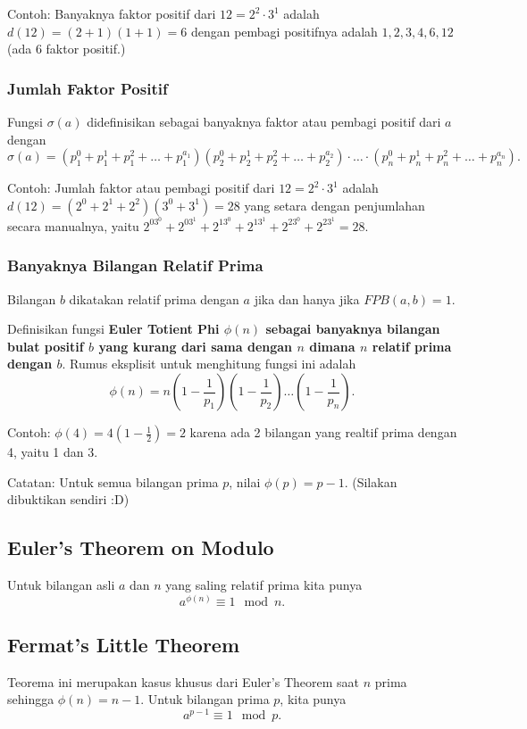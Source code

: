 Contoh: Banyaknya faktor positif dari $12= 2^2 \cdot 3^1$ adalah $d(12)=(2+1)(1+1)=6$ dengan pembagi positifnya adalah $1,2,3,4,6,12$ (ada 6 faktor positif.)
\subsubsection{Jumlah Faktor Positif}
Fungsi $\sigma (a)$ didefinisikan sebagai banyaknya faktor atau pembagi positif dari $a$ dengan
$$\sigma (a) = (p_1^0+p_1^1+p_1^2+\dots+p_1^{a_1})(p_2^0+p_2^1+p_2^2+\dots+p_2^{a_2})\cdot \ldots \cdot (p_n^0+p_n^1+p_n^2+\dots+p_n^{a_n}).$$

Contoh: Jumlah faktor atau pembagi positif dari $12= 2^2 \cdot 3^1$ adalah $d(12)=(2^0+2^1+2^2)(3^0+3^1)=28$ yang setara dengan penjumlahan secara manualnya, yaitu $2^03^0+2^03^1+2^13^0+2^13^1+2^23^0+2^23^1=28.$
\subsubsection{Banyaknya Bilangan Relatif Prima}
\begin{remark*}
         Bilangan $b$ dikatakan relatif prima dengan $a$ jika dan hanya jika $FPB(a,b)=1$.
    \end{remark*}
 Definisikan fungsi \textbf{Euler Totient Phi $\phi(n)$ sebagai banyaknya bilangan bulat positif $b$ yang kurang dari sama dengan $n$ dimana $n$ relatif prima dengan $b$}. Rumus eksplisit untuk menghitung fungsi ini adalah
$$\phi(n) = n\left(1-\dfrac{1}{p_1}\right)\left(1-\dfrac{1}{p_2}\right)\dots\left(1-\dfrac{1}{p_n}\right).$$

Contoh: $\phi(4)=4(1-\frac{1}{2})=2$ karena ada 2 bilangan yang realtif prima dengan 4, yaitu 1 dan 3.

Catatan: Untuk semua bilangan prima $p$, nilai $\phi(p) = p-1$. (Silakan dibuktikan sendiri :D)

\subsection{Euler's Theorem on Modulo}
Untuk bilangan asli $a$ dan $n$ yang saling relatif prima kita punya
$$a^{\phi(n)} \equiv 1 \mod n.$$

\subsection{Fermat's Little Theorem}
Teorema ini merupakan kasus khusus dari Euler's Theorem saat $n$ prima sehingga $\phi(n)=n-1$. Untuk bilangan prima $p$, kita punya
$$a^{p-1} \equiv 1 \mod p.$$
